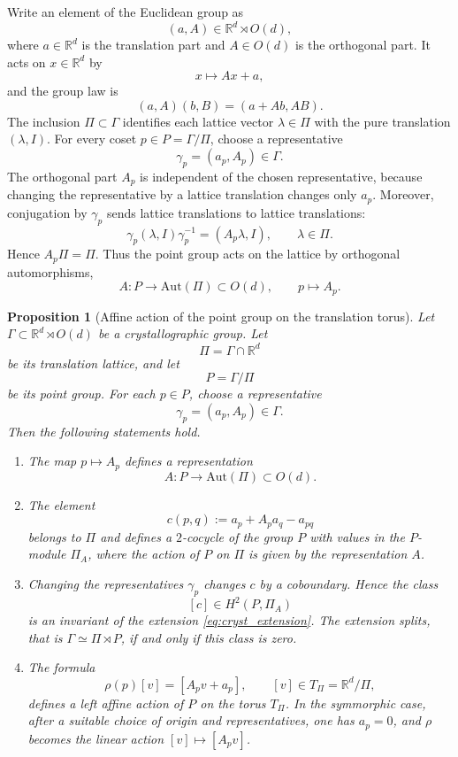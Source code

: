 \documentclass[11pt]{amsart}
\theoremstyle{plain}
\newtheorem{proposition}{Proposition}[section]
\theoremstyle{definition}
\theoremstyle{remark}
\begin{document}
Write an element of the Euclidean group as
\[
(a,A)\in \mathbb R^d\rtimes O(d),
\]
where \(a\in\mathbb R^d\) is the translation part and \(A\in O(d)\) is the orthogonal part. 
It acts on \(x\in\mathbb R^d\) by
\[
x\longmapsto Ax+a,
\]
and the group law is
\[
(a,A)(b,B)=(a+Ab,AB).
\]
The inclusion \(\Pi\subset\Gamma\) identifies each lattice vector \(\lambda\in\Pi\) with the pure translation \((\lambda,I)\). 
For every coset \(p\in P=\Gamma/\Pi\), choose a representative
\[
\gamma_p=(a_p,A_p)\in\Gamma.
\]
The orthogonal part \(A_p\) is independent of the chosen representative, because changing the representative by a lattice translation changes only \(a_p\). 
Moreover, conjugation by \(\gamma_p\) sends lattice translations to lattice translations:
\[
\gamma_p(\lambda,I)\gamma_p^{-1}=(A_p\lambda,I),
\qquad
\lambda\in\Pi.
\]
Hence \(A_p\Pi=\Pi\). 
Thus the point group acts on the lattice by orthogonal automorphisms,
\[
A:P\longrightarrow \mathrm{Aut}(\Pi)\subset O(d),
\qquad
p\longmapsto A_p.
\]

\begin{proposition}[Affine action of the point group on the translation torus]
	\label{prop:affine_point_action}
	Let \(\Gamma\subset \mathbb R^d\rtimes O(d)\) be a crystallographic group. 
	Let
	\[
	\Pi=\Gamma\cap\mathbb R^d
	\]
	be its translation lattice, and let
	\[
	P=\Gamma/\Pi
	\]
	be its point group. 
	For each \(p\in P\), choose a representative
	\[
	\gamma_p=(a_p,A_p)\in\Gamma.
	\]
	Then the following statements hold.
	
	\begin{enumerate}[label=\textup{(\roman*)}]
		\item The map \(p\mapsto A_p\) defines a representation
		\[
		A:P\to \mathrm{Aut}(\Pi)\subset O(d).
		\]
		
		\item The element
		\begin{equation}
			c(p,q):=a_p+A_pa_q-a_{pq}
			\label{eq:extension_cocycle}
		\end{equation}
		belongs to \(\Pi\) and defines a \(2\)-cocycle of the group \(P\) with values in the \(P\)-module \(\Pi_A\), where the action of \(P\) on \(\Pi\) is given by the representation \(A\).
		
		\item Changing the representatives \(\gamma_p\) changes \(c\) by a coboundary. Hence the class
		\[
		[c]\in H^2(P,\Pi_A)
		\]
		is an invariant of the extension \eqref{eq:cryst_extension}. The extension splits, that is \(\Gamma\simeq\Pi\rtimes P\), if and only if this class is zero.
		
		\item The formula
		\begin{equation}
			\rho(p)[v]=[A_pv+a_p],
			\qquad [v]\in T_\Pi=\mathbb R^d/\Pi,
			\label{eq:affine_torus_action}
		\end{equation}
		defines a left affine action of \(P\) on the torus \(T_\Pi\). 
		In the symmorphic case, after a suitable choice of origin and representatives, one has \(a_p=0\), and \(\rho\) becomes the linear action \([v]\mapsto[A_pv]\).
	\end{enumerate}
\end{proposition}
\end{document}
